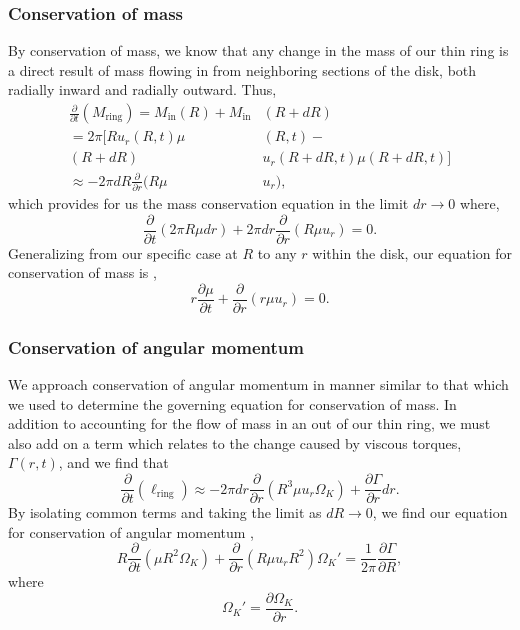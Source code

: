 \documentclass[aps,pra,twocolumn]{revtex4-1}
\begin{document}
\subsubsection{\label{section 2.1.1} Conservation of mass}
By conservation of mass, we know that any change in the mass of our thin ring is a direct result of mass flowing in from neighboring sections of the disk, both radially inward and radially outward.  Thus,
\begin{equation}
\begin{split}
\frac{\partial}{\partial t}\left(  M_\text{ring}\right)= M_{\text{in}}(R) + M_{\text{in}}&(R + dR)  \\
= 2\pi [ R u_r(R, t) \mu&(R, t) -   \\
(R + dR)& u_r(R+dR, t) \mu(R+dR, t)] \\
 \approx -2\pi dR \frac{\partial}{\partial r}(R\mu& u_r),
\nonumber
\end{split}
\end{equation}
which provides for us the mass conservation equation in the limit $dr \rightarrow 0$ where,
\begin{equation}
\frac{\partial}{\partial t}\left(  2\pi R  \mu dr \right) + 2\pi dr \frac{\partial}{\partial r}(R \mu u_r) = 0. \nonumber
\end{equation}
Generalizing from our specific case at $R$ to any $r$ within the disk, our equation for conservation of mass is \cite{king2002},
\begin{equation}
r \frac{\partial \mu}{\partial t} + \frac{\partial}{\partial r}(r \mu u_r) = 0. \label{consMass}
\end{equation}

\subsubsection{\label{section 2.1.2} Conservation of angular momentum}
We approach conservation of angular momentum in manner similar to that which we used to determine the governing equation for conservation of mass. In addition to accounting for the flow of mass in an out of our thin ring, we must also add on a term which relates to the change caused by viscous torques, $\Gamma(r, t)$, and we find that
\begin{equation}
\frac{\partial}{\partial t}\left( \ell_{\text{ring}} \right) \approx  -2\pi dr \frac{\partial}{\partial r}(R^3 \mu u_r \Omega_K) + \frac{\partial \Gamma}{\partial r}dr.
\nonumber
\end{equation}
By isolating common terms and taking the limit as $dR \rightarrow 0$, we find our equation for conservation of angular momentum \cite{king2002},
\begin{equation}
R \frac{\partial}{\partial t} (\mu R^2 \Omega_K) + \frac{\partial}{\partial r} (R \mu u_r R^2  )\Omega_K' = \frac{1}{2\pi} \frac{\partial \Gamma}{\partial R}, \label{consAng}
\end{equation}
where
\begin{equation}
\Omega_K' = \frac{\partial \Omega_K}{\partial r}.
\end{equation}
\end{document}
